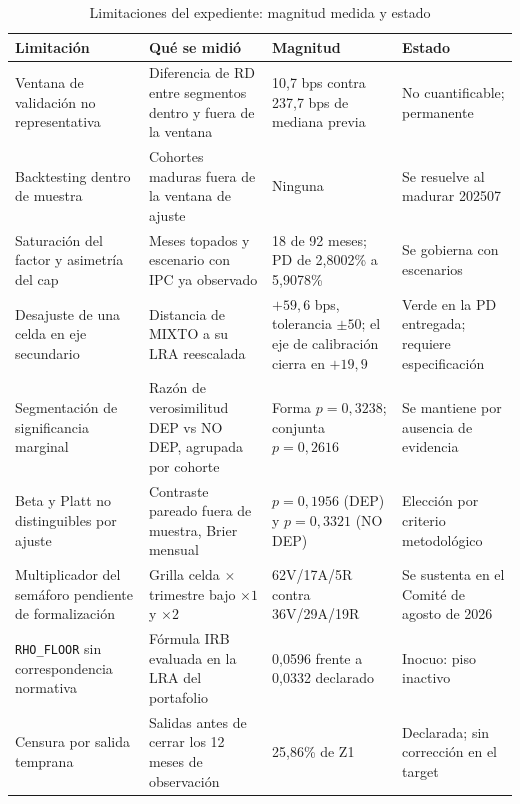 \documentclass[12pt, a4paper]{article}
\newcommand{\PD}{\ensuremath{\mathrm{PD}}}
\newcommand{\RD}{\ensuremath{\mathrm{RD}}}
\newcommand{\LRA}{\ensuremath{\mathrm{LRA}}}
\begin{document}
\begin{table}[H]
\centering
\caption{Limitaciones del expediente: magnitud medida y estado}
\label{tab:limitaciones}
\small
\setlength{\tabcolsep}{4pt}
\begin{tabular}{p{3.5cm}p{4.4cm}p{3.5cm}p{2.9cm}}
\toprule
\textbf{Limitación} & \textbf{Qué se midió} & \textbf{Magnitud} & \textbf{Estado} \\
\midrule
Ventana de validación no representativa & Diferencia de \RD{} entre segmentos dentro y fuera de la ventana & 10,7 bps contra 237,7 bps de mediana previa & No cuantificable; permanente \\
\addlinespace
Backtesting dentro de muestra & Cohortes maduras fuera de la ventana de ajuste & Ninguna & Se resuelve al madurar 202507 \\
\addlinespace
Saturación del factor y asimetría del cap & Meses topados y escenario con IPC ya observado & 18 de 92 meses; \PD{} de 2,8002\% a 5,9078\% & Se gobierna con escenarios \\
\addlinespace
Desajuste de una celda en eje secundario & Distancia de MIXTO a su \LRA{} reescalada & $+59{,}6$ bps, tolerancia $\pm50$; el eje de calibración cierra en $+19{,}9$ & Verde en la PD entregada; requiere especificación \\
\addlinespace
Segmentación de significancia marginal & Razón de verosimilitud DEP vs NO DEP, agrupada por cohorte & Forma $p=0{,}3238$; conjunta $p=0{,}2616$ & Se mantiene por ausencia de evidencia \\
\addlinespace
Beta y Platt no distinguibles por ajuste & Contraste pareado fuera de muestra, Brier mensual & $p=0{,}1956$ (DEP) y $p=0{,}3321$ (NO DEP) & Elección por criterio metodológico \\
\addlinespace
Multiplicador del semáforo pendiente de formalización & Grilla celda $\times$ trimestre bajo $\times1$ y $\times2$ & 62V/17A/5R contra 36V/29A/19R & Se sustenta en el Comité de agosto de 2026 \\
\addlinespace
\texttt{RHO\_FLOOR} sin correspondencia normativa & Fórmula IRB evaluada en la \LRA{} del portafolio & 0,0596 frente a 0,0332 declarado & Inocuo: piso inactivo \\
\addlinespace
Censura por salida temprana & Salidas antes de cerrar los 12 meses de observación & 25,86\% de Z1 & Declarada; sin corrección en el target \\
\bottomrule
\end{tabular}
\end{table}
\end{document}
